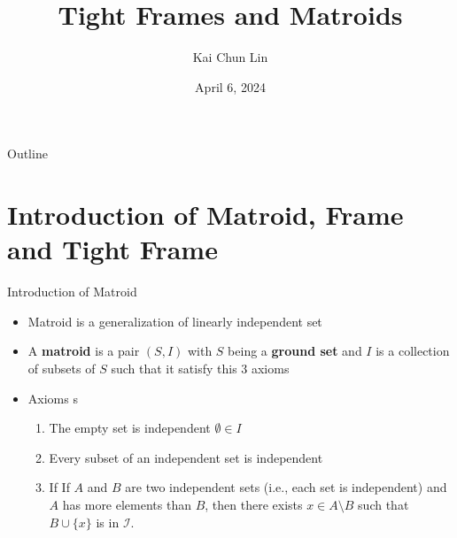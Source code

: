 \documentclass{beamer}
\title[Tight Frames and Matroids]{Tight Frames and Matroids}
\author{Kai Chun Lin}
\institute{Rose-Hulman}
\date{ April 6, 2024}
\begin{document}
\begin{frame}
  \titlepage
\end{frame}

\begin{frame}{Outline}
  \tableofcontents
\end{frame}


\section{Introduction of Matroid, Frame and Tight Frame}
\begin{frame}{Introduction of Matroid}
 \begin{itemize}
    \item Matroid is a generalization of linearly independent set
    \item A \textbf{matroid} is a pair $(S,I)$ with $S$ being a \textbf{ground set} and $I$ is a collection of subsets of $S$ such that it satisfy this 3 axioms
     \item Axioms
     s
      \begin{enumerate}
      
        \item The empty set is independent $\emptyset \in \textit{I}$
        \item Every subset of an independent set is independent
        \item If If $A$ and $B$ are two independent sets (i.e., each set is independent) and $A$ has more elements than $B$, then there exists $x \in A \setminus B$ such that $B \cup \{x\}$ is in $\mathcal{I}$.
        \cite{oxley2003matroid}
    \end{enumerate}
  \end{itemize}
\end{frame}
\end{document}
